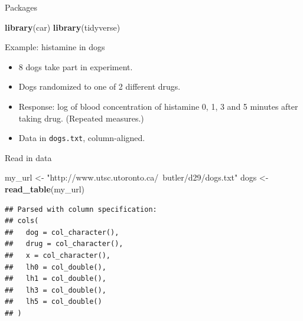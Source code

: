 \documentclass[ignorenonframetext,]{beamer}
\newenvironment{Shaded}{\begin{snugshade}}{\end{snugshade}}
\newcommand{\KeywordTok}[1]{\textcolor[rgb]{0.13,0.29,0.53}{\textbf{#1}}}
\newcommand{\NormalTok}[1]{#1}
\newcommand{\StringTok}[1]{\textcolor[rgb]{0.31,0.60,0.02}{#1}}
\begin{document}
\begin{frame}[fragile]{Packages}
\protect\hypertarget{packages-5}{}

\begin{Shaded}
\begin{Highlighting}[]
\KeywordTok{library}\NormalTok{(car)}
\KeywordTok{library}\NormalTok{(tidyverse)}
\end{Highlighting}
\end{Shaded}

\end{frame}

\begin{frame}[fragile]{Example: histamine in dogs}
\protect\hypertarget{example-histamine-in-dogs}{}

\begin{itemize}
\item
  8 dogs take part in experiment.
\item
  Dogs randomized to one of 2 different drugs.
\item
  Response: log of blood concentration of histamine 0, 1, 3 and 5
  minutes after taking drug. (Repeated measures.)
\item
  Data in \texttt{dogs.txt}, column-aligned.
\end{itemize}

\end{frame}

\begin{frame}[fragile]{Read in data}
\protect\hypertarget{read-in-data-3}{}

\begin{Shaded}
\begin{Highlighting}[]
\NormalTok{my_url <-}\StringTok{ "http://www.utsc.utoronto.ca/~butler/d29/dogs.txt"}
\NormalTok{dogs <-}\StringTok{ }\KeywordTok{read_table}\NormalTok{(my_url)}
\end{Highlighting}
\end{Shaded}

\begin{verbatim}
## Parsed with column specification:
## cols(
##   dog = col_character(),
##   drug = col_character(),
##   x = col_character(),
##   lh0 = col_double(),
##   lh1 = col_double(),
##   lh3 = col_double(),
##   lh5 = col_double()
## )
\end{verbatim}

\end{frame}
\end{document}
